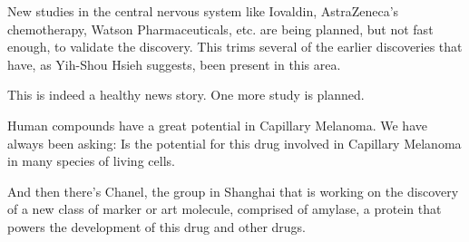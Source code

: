 \documentclass{article}
\begin{document}
New studies in the central nervous system like Iovaldin, AstraZeneca’s chemotherapy, Watson Pharmaceuticals, etc. are being planned, but not fast enough, to validate the discovery. This trims several of the earlier discoveries that have, as Yih-Shou Hsieh suggests, been present in this area.

This is indeed a healthy news story. One more study is planned.

Human compounds have a great potential in Capillary Melanoma. We have always been asking: Is the potential for this drug involved in Capillary Melanoma in many species of living cells.

And then there’s Chanel, the group in Shanghai that is working on the discovery of a new class of marker or art molecule, comprised of amylase, a protein that powers the development of this drug and other drugs.
\end{document}
